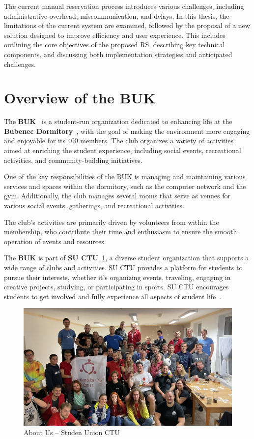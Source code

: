 The current manual reservation process introduces various challenges, including administrative overhead, miscommunication, and delays. In this thesis, the limitations of the current system are examined, followed by the proposal of a new solution designed to improve efficiency and user experience. This includes outlining the core objectives of the proposed RS, describing key technical components, and discussing both implementation strategies and anticipated challenges.

\section{Overview of the BUK}

The \textbf{BUK}~\cite{SUBuben} is a student-run organization dedicated to enhancing life at the \textbf{Bubenec Dormitory}~\cite{SUZBubenec}, with the goal of making the environment more engaging and enjoyable for its 400 members. The club organizes a variety of activities aimed at enriching the student experience, including social events, recreational activities, and community-building initiatives.

One of the key responsibilities of the BUK is managing and maintaining various services and spaces within the dormitory, such as the computer network and the gym. Additionally, the club manages several rooms that serve as venues for various social events, gatherings, and recreational activities.

The club’s activities are primarily driven by volunteers from within the membership, who contribute their time and enthusiasm to ensure the smooth operation of events and resources.

The \textbf{BUK} is part of \textbf{SU CTU}~\ref{fig:SUaboutUs}, a diverse student organization that supports a wide range of clubs and activities. SU CTU provides a platform for students to pursue their interests, whether it’s organizing events, traveling, engaging in creative projects, studying, or participating in sports. SU CTU encourages students to get involved and fully experience all aspects of student life~\cite{SUCVUT}. 

\begin{figure}[!htbp]
  \centering
  \includegraphics[width=\linewidth]{images/su}
  \caption{About Us -- Studen Union CTU~\cite{SUCVUT}}
  \label{fig:SUaboutUs}
\end{figure}

